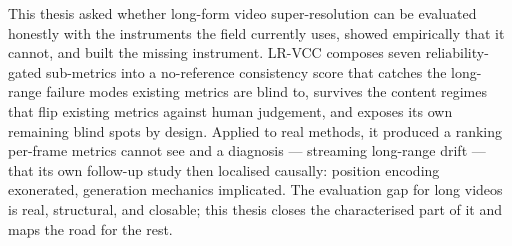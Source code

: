 This thesis asked whether long-form video super-resolution can be evaluated
honestly with the instruments the field currently uses, showed empirically that
it cannot, and built the missing instrument. LR-VCC composes seven
reliability-gated sub-metrics into a no-reference consistency score that
catches the long-range failure modes existing metrics are blind to, survives
the content regimes that flip existing metrics against human judgement, and
exposes its own remaining blind spots by design. Applied to real methods, it
produced a ranking per-frame metrics cannot see and a diagnosis --- streaming
long-range drift --- that its own follow-up study then localised causally:
position encoding exonerated, generation mechanics implicated. The evaluation
gap for long videos is real, structural, and closable; this thesis closes the
characterised part of it and maps the road for the rest.
